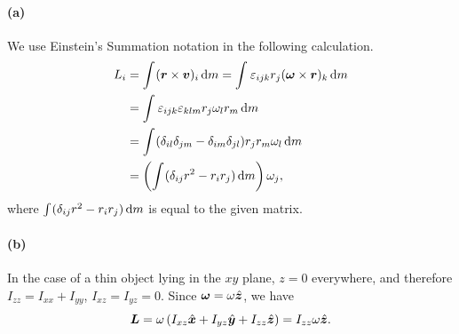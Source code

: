 \documentclass{article}
\begin{document}
\begin{solution}
	\paragraph{(a)} We use Einstein's Summation notation in the following calculation.
	\begin{align*}
		L_i &= \int_{}^{}(\boldsymbol{r} \times \boldsymbol{v})_i\,\mathrm{d} m
		= \int_{}^{}\varepsilon_{ijk}r_j (\boldsymbol{\omega} \times \boldsymbol{r})_k \,\mathrm{d} m \\
		&= \int_{}^{}\varepsilon_{ijk}\varepsilon_{klm}r_j \omega_l r_m \,\mathrm{d} m \\
		&= \int_{}^{}(\delta_{il} \delta_{jm} - \delta_{im} \delta_{jl})r_j r_m \omega_l \,\mathrm{d} m \\
		&= \left( \int_{}^{} (\delta_{ij} r^2 - r_i r_j)\,\mathrm{d} m \right) \omega_j,
	\end{align*}
	where $\int_{}^{} (\delta_{ij} r^2 - r_i r_j)\,\mathrm{d} m$ is equal to the given matrix.

	\paragraph{(b)} In the case of a thin object lying in the $xy$ plane, $z=0$ everywhere, and therefore $I_{zz} = I_{xx} + I_{yy}$, $I_{xz} = I_{yz} = 0$. Since $\boldsymbol{\omega} = \omega \hat{\boldsymbol{z}}$, we have
	\[ \boldsymbol{L} = \omega\left( I_{xz} \hat{\boldsymbol{x}} + I_{yz} \hat{\boldsymbol{y}} + I_{zz} \hat{\boldsymbol{z}} \right) = I_{zz} \omega \hat{\boldsymbol{z}}. \]
\end{solution}
\end{document}
